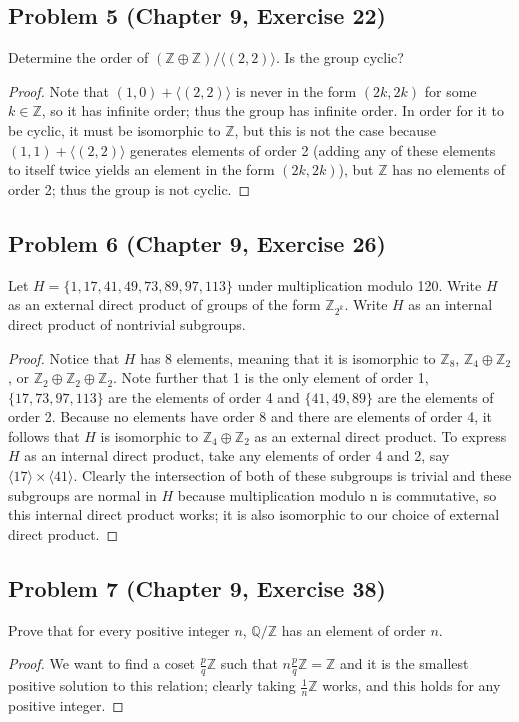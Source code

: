\documentclass{article}
\begin{document}
\subsection*{Problem 5 (Chapter 9, Exercise 22)}
Determine the order of $(\mathbb{Z} \oplus \mathbb{Z})/\langle(2, 2)\rangle$. Is the group cyclic?
\begin{proof} 
Note that $(1, 0) + \langle (2, 2) \rangle$ is never in the form $(2k, 2k)$ for some $k \in \mathbb{Z}$, so it has infinite order; thus the group has infinite order. In order for it to be cyclic, it must be isomorphic to $\mathbb{Z}$, but this is not the case because $(1, 1) + \langle (2, 2) \rangle$ generates elements of order 2 (adding any of these elements to itself twice yields an element in the form $(2k, 2k)$), but $\mathbb{Z}$ has no elements of order 2; thus the group is not cyclic.
\end{proof}


\subsection*{Problem 6 (Chapter 9, Exercise 26)}
Let $H = \{1, 17, 41, 49, 73, 89, 97, 113\}$ under multiplication modulo 120. Write $H$ as an external direct product of groups of the form $\mathbb{Z}_{2^k}$. Write $H$ as an internal direct product of nontrivial subgroups. 
\begin{proof}
Notice that $H$ has 8 elements, meaning that it is isomorphic to $\mathbb{Z}_8$, $\mathbb{Z}_4 \oplus \mathbb{Z}_2$, or $\mathbb{Z}_2 \oplus \mathbb{Z}_2 \oplus \mathbb{Z}_2$. Note further that 1 is the only element of order 1, $\{17, 73, 97, 113\}$ are the elements of order 4 and $\{41, 49, 89\}$ are the elements of order 2. Because no elements have order 8 and there are elements of order 4, it follows that $H$ is isomorphic to $\mathbb{Z}_4 \oplus \mathbb{Z}_2$ as an external direct product. To express $H$ as an internal direct product, take any elements of order 4 and 2, say $\langle 17 \rangle \times \langle 41 \rangle$. Clearly the intersection of both of these subgroups is trivial and these subgroups are normal in $H$ because multiplication modulo n is commutative, so this internal direct product works; it is also isomorphic to our choice of external direct product.
\end{proof}

\subsection*{Problem 7 (Chapter 9, Exercise 38)}
Prove that for every positive integer $n$, $\mathbb{Q}/\mathbb{Z}$ has an element of order $n$.
\begin{proof}
We want to find a coset $\frac{p}{q}\mathbb{Z}$ such that $n\frac{p}{q}\mathbb{Z} = \mathbb{Z}$ and it is the smallest positive solution to this relation; clearly taking $\frac{1}{n}\mathbb{Z}$ works, and this holds for any positive integer.
\end{proof}
\end{document}
